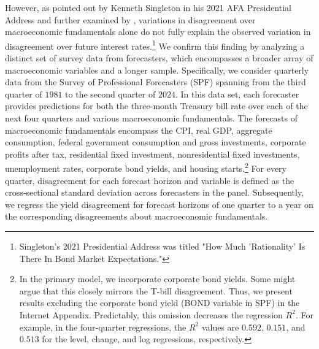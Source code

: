 \documentclass[preprint,11pt,authoryear]{elsarticle}
\theoremstyle{plain}
\begin{document}
However, as pointed out by Kenneth Singleton in his 2021 AFA Presidential Address and further examined by \cite{GiacolettiLaursenSingleton2021}, variations in disagreement over macroeconomic fundamentals alone do not fully explain the observed variation in disagreement over future interest rates.\footnote{Singleton's 2021 Presidential Address was titled "How Much 'Rationality' Is There In Bond Market Expectations."} We confirm this finding by analyzing a distinct set of survey data from forecasters, which encompasses a broader array of macroeconomic variables and a longer sample. Specifically, we consider quarterly data from the Survey of Professional Forecasters (SPF) spanning from the third quarter of $1981$ to the second quarter of $2024$. In this data set, each forecaster provides predictions for both the three-month Treasury bill rate over each of the next four quarters and various macroeconomic fundamentals. The forecasts of macroeconomic fundamentals encompass the CPI, real GDP, aggregate consumption, federal government consumption and gross investments, corporate profits after tax, residential fixed investment, nonresidential fixed investments, unemployment rates, corporate bond yields, and housing starts.\footnote{In the primary model, we incorporate corporate bond yields. Some might argue that this closely mirrors the T-bill disagreement. Thus, we present results excluding the corporate bond yield (BOND variable in SPF) in the Internet Appendix. Predictably, this omission decreases the regression $R^2$. For example, in the four-quarter regressions, the $R^2$ values are $0.592$, $0.151$, and $0.513$ for the level, change, and log regressions, respectively.} For every quarter, disagreement for each forecast horizon and variable is defined as the cross-sectional standard deviation across forecasters in the panel. Subsequently, we regress the yield disagreement for forecast horizons of one quarter to a year on the corresponding disagreements about macroeconomic fundamentals. 
\end{document}
